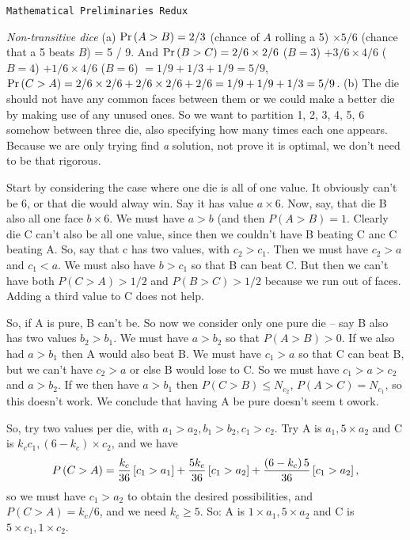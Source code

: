 \def\newstep#1{\smallskip \noindent {\bf #1}}
\def\newprob#1{\vskip 0.12in \noindent {\bf #1}}

\topglue 0.5in
\centerline{\tt Mathematical Preliminaries Redux}
\vskip 0.3in

 {\it Non-transitive dice}\hfil\break
(a) ${\rm Pr}\left(A > B\right) = 2 / 3$ (chance of $A$ rolling a 5) $\times 5 / 6$
(chance that a 5 beats $B$) = 5 / 9.  And ${\rm Pr}\left(B > C\right) = 2 / 6 \times 2 / 6$
($B = 3$) $ + 3 / 6 \times 4 / 6$ ($B = 4$) $+ 1 / 6 \times 4 / 6$ ($B = 6$)
$ = 1 / 9 + 1 / 3 + 1 / 9 = 5 / 9$, ${\rm Pr}\left(C > A\right) = 2 / 6 \times 2 / 6 +
2 / 6 \times 2 / 6 + 2 / 6 = 1 / 9 + 1 / 9 + 1 / 3 = 5 / 9$.\hfil\break
(b) The die should not have any common faces between them or we could make a better
die by making use of any unused ones.  So we want to partition {1, 2, 3, 4, 5, 6} somehow between
three die, also specifying how many times each one appears.  Because we are only trying find
{\it a} solution, not prove it is optimal, we don't need to be that rigorous.

Start by considering the case where one die is all of one value.  It obviously can't be 6, or
that die would alway win.  Say it has value $a \times 6$.  Now, say, that die B also all one
face $b \times 6$.  We must have $a > b$ (and then $P\left(A > B\right) = 1$.   Clearly
die C can't also be all one value, since then we couldn't have B beating C anc C beating A.
So, say that c has two values, with $c_2 > c_1$.  Then we must have $c_2 > a$ and $c_1 < a$.
We must also have $b > c_1$ so that B can beat C.  But then we can't have both 
$P\left(C > A\right) > 1/2$ and $P \left(B > C\right) > 1/2$ because we run out of faces.
Adding a third value to C does not help.

So, if A is pure, B can't be.  So now we consider only one pure die -- say B also has two values
$b_2 > b_1$.  We must have $a > b_2$ so that $P\left(A > B\right) > 0$.  If we also had 
$a > b_1$ then A would also beat B.  We must have $c_1 > a$ so that C can beat B,
but we can't have $c_2 > a$ or else B would lose to C.  So we must have $c_1 > a > c_2$ and $a > b_2$.
If we then have $a > b_1$ then $P\left(C > B\right) \leq N_{c_2}$, $P \left(A > C\right) = N_{c_1}$,
so this doesn't work.  We conclude that having A be pure doesn't seem t owork.

So, try two values per die, with $a_1 > a_2, b_1 > b_2, c_1 > c_2$.  Try A is $a_1, 5 \times a_2$
and C is $k_c c_1, \left(6-k_c\right) \times c_2$, and we have
$$
 P\left(C > A\right) = {k_c \over 36} \left[c_1 > a_1\right] + {5 k_c \over 36} \left[c_1 > a_2\right]
  + {\left(6 - k_c\right) 5 \over 36} \left[c_1 > a_2\right],
$$
so we must have $c_1 > a_2$ to obtain the desired possibilities, and $P\left(C > A\right) = k_c / 6$,
and we need $k_c \geq 5$.  So: A is $1 \times a_1, 5 \times a_2$ and C is $5 \times c_1, 1 \times c_2$.

